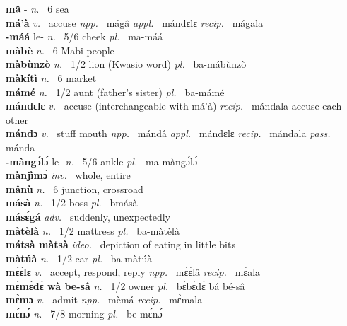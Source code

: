 \noindent
{\bfseries mã̂} - {\itshape n.~} 6 sea    \\ 
{\bfseries má'à}  {\itshape v.~} accuse   {\itshape npp.~} mágâ {\itshape appl.~} mándɛlɛ {\itshape recip.~} mágala \\ 
{\bfseries -máá} le- {\itshape n.~} 5/6 cheek {\itshape pl.~} ma-máá    \\ 
{\bfseries màbè}  {\itshape n.~} 6 Mabi people    \\ 
{\bfseries màbùnzò}  {\itshape n.~} 1/2 lion (Kwasio word) {\itshape pl.~} ba-mábùnzò    \\ 
{\bfseries màkítì}  {\itshape n.~} 6 market    \\ 
{\bfseries mámé}  {\itshape n.~} 1/2 aunt (father's sister) {\itshape pl.~} ba-mámé    \\ 
{\bfseries mándɛlɛ}  {\itshape v.~} accuse (interchangeable with má'à) {\itshape recip.~} mándala accuse each other  \\ 
{\bfseries mándɔ}  {\itshape v.~} stuff mouth   {\itshape npp.~} mándâ {\itshape appl.~} mándɛlɛ {\itshape recip.~} mándala {\itshape pass.~} mánda  \\ 
{\bfseries -màngɔ́lɔ́} le- {\itshape n.~} 5/6 ankle {\itshape pl.~} ma-màngɔ́lɔ́    \\ 
{\bfseries mànjìmɔ̀}  {\itshape inv.~} whole, entire    \\ 
{\bfseries mânù}  {\itshape n.~} 6 junction, crossroad    \\ 
{\bfseries másà}  {\itshape n.~} 1/2 boss {\itshape pl.~} bmásà    \\ 
{\bfseries másɛ́gá}  {\itshape adv.~} suddenly, unexpectedly    \\ 
{\bfseries màtèlà}  {\itshape n.~} 1/2 mattress {\itshape pl.~} ba-màtèlà    \\ 
{\bfseries mátsà màtsà}  {\itshape ideo.~} depiction of eating in little bits    \\ 
{\bfseries màtúà}  {\itshape n.~} 1/2 car {\itshape pl.~} ba-màtúà    \\ 
{\bfseries mɛ́ɛ̀lɛ}  {\itshape v.~} accept, respond, reply   {\itshape npp.~} mɛ́ɛ́lâ {\itshape recip.~} mɛ́ala  \\ 
{\bfseries mɛ́mɛ́dɛ́ wà be-sâ}  {\itshape n.~} 1/2 owner {\itshape pl.~} bɛ́bɛ́dɛ́ bá bé-sâ    \\ 
{\bfseries mɛ̀mɔ}  {\itshape v.~} admit   {\itshape npp.~} mèmá {\itshape recip.~} mɛ̀mala  \\ 
{\bfseries mɛ́nɔ́}  {\itshape n.~} 7/8 morning {\itshape pl.~} be-mɛ́nɔ́    \\ 
